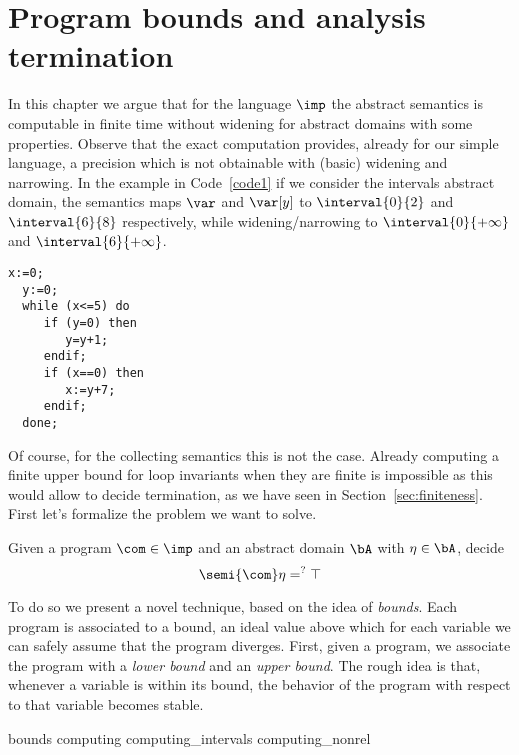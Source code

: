 \chapter{Program bounds and analysis termination}
\label{chap:axiomatized}


In this chapter we argue that for the language \(\imp\) the abstract
semantics is computable in finite time without widening for abstract
domains with some properties.  Observe that the exact computation
provides, already for our simple language, a precision which is not
obtainable with (basic) widening and narrowing. In the example in
Code~\ref{code1} if we consider the intervals abstract domain, the
semantics maps \(\var\) and \(\var[y]\) to \(\interval{0}{2}\) and
\(\interval{6}{8}\) respectively, while widening/narrowing to
\(\interval{0}{+\infty}\) and \(\interval{6}{+\infty}\).

\begin{lstlisting}[caption=Code sample where analysis of
  \(\fix{\com}\) is less precise than \(\com^*\), label=code1,
  language=Imp]
  x:=0;
  y:=0;
  while (x<=5) do
     if (y=0) then
        y=y+1;
     endif;
     if (x==0) then
        x:=y+7;
     endif;
  done;
\end{lstlisting}

Of course, for the collecting semantics this is not the case. Already
computing a finite upper bound for loop invariants when they are
finite is impossible as this would allow to decide termination, as we
have seen in Section~\ref{sec:finiteness}. First let's formalize the
problem we want to solve.

\begin{problem}\label{problem1}
  Given a program \(\com\in \imp\) and an abstract domain \(\bA\) with
  \(\eta \in \bA\), decide
  \begin{equation*}
    \semi{\com} \eta =^? \top
  \end{equation*}
\end{problem}

To do so we present a novel technique, based on the idea of
\emph{bounds}. Each program is associated to a bound, an ideal value
above which for each variable we can safely assume that the program
diverges.  First, given a program, we associate the program with a
\emph{lower bound} and an \emph{upper bound}. The rough idea is that,
whenever a variable is within its bound, the behavior of the program
with respect to that variable becomes stable. %

{bounds}
{computing}
{computing_intervals}
{computing_nonrel}
